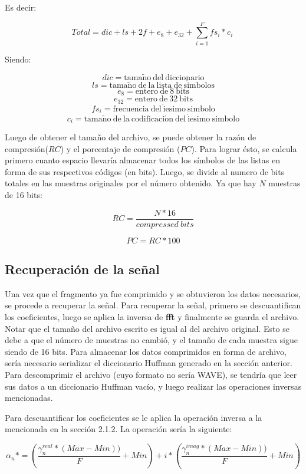 \documentclass[12pt,a4paper]{article}
\begin{document}
  Es decir:

$$ Total = dic + ls + 2f + e_8 + e_{32} + \sum_{i=1}^{F}fs_{i} * c_{i}  \ $$
  
  Siendo:
  
$$ dic = \mathrm{tama\tilde{n}o\ del\ diccionario}$$
$$ ls = \mathrm{tama\tilde{n}o\ de\ la\ lista\ de\ s\acute{i}mbolos}$$
$$ e_8 = \mathrm{entero\ de\ 8\ bits}$$
$$ e_{32} = \mathrm{entero\ de\ 32\ bits} $$
$$ fs_i = \mathrm{frecuencia\ del\ \acute{i}esimo\ simbolo} $$
$$ c_i = \mathrm{tama\tilde{n}o\ de\ la\ codificaci\acute{o}n\ del\ \acute{i}esimo\ simbolo} $$

  Luego de obtener  el tamaño del archivo, se puede obtener la razón de compresión($RC$) y  el porcentaje de compresión ($PC$). Para lograr ésto, se calcula primero cuanto espacio llevaría almacenar todos los símbolos de las listas en forma de sus respectivos códigos (en bits).  Luego, se divide al numero de bits totales en las muestras originales por el número obtenido.  Ya que hay $N$ muestras de 16 bits:
  
$$ RC = \frac{N*16}{compressed\ bits} $$

$$ PC = RC * 100$$

\subsection{Recuperación de la señal}

      Una vez que el fragmento ya fue comprimido y se obtuvieron los datos necesarios, se procede a recuperar la señal. Para recuperar la señal, primero se descuantifican los coeficientes, luego se aplica la inversa de \textbf{fft} y finalmente se guarda el archivo.  Notar que el tamaño del archivo escrito es igual al del archivo original.  Esto se debe a que el número de muestras no cambió, y el tamaño de cada muestra sigue siendo de 16 bits.  Para almacenar los datos comprimidos en forma de archivo, sería necesario serializar el diccionario Huffman generado en la sección anterior.  Para descomprimir el archivo (cuyo formato no sería WAVE), se tendría que leer sus datos a un diccionario Huffman vacío, y luego realizar las operaciones inversas mencionadas.

      Para descuantificar los coeficientes se le aplica la operación inversa a la mencionada en la sección 2.1.2. La operación sería la siguiente: 
      
$$\alpha_n* = (\frac{\gamma^{real}_n*(Max - Min))}{F} + Min) + i*(\frac{\gamma^{imag}_n*(Max - Min))}{F} + Min)$$
      
\end{document}
